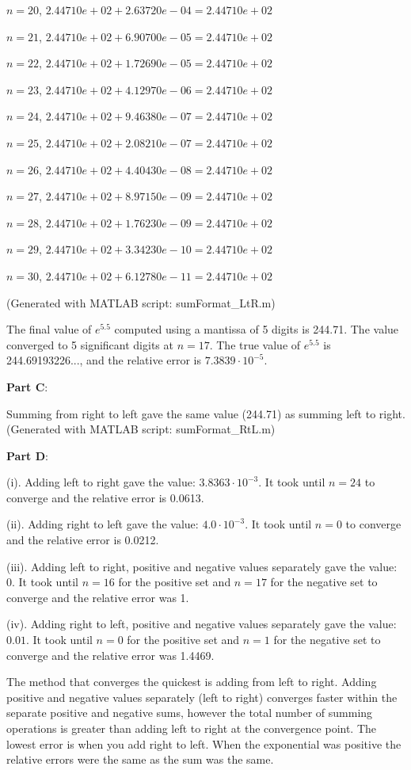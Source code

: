 \documentclass[12pt]{article}
\begin{document}
$n = 20$, $2.44710e+02 + 2.63720e-04 = 2.44710e+02$

$n = 21$, $2.44710e+02 + 6.90700e-05 = 2.44710e+02$

$n = 22$, $2.44710e+02 + 1.72690e-05 = 2.44710e+02$

$n = 23$, $2.44710e+02 + 4.12970e-06 = 2.44710e+02$

$n = 24$, $2.44710e+02 + 9.46380e-07 = 2.44710e+02$

$n = 25$, $2.44710e+02 + 2.08210e-07 = 2.44710e+02$

$n = 26$, $2.44710e+02 + 4.40430e-08 = 2.44710e+02$

$n = 27$, $2.44710e+02 + 8.97150e-09 = 2.44710e+02$

$n = 28$, $2.44710e+02 + 1.76230e-09 = 2.44710e+02$

$n = 29$, $2.44710e+02 + 3.34230e-10 = 2.44710e+02$

$n = 30$, $2.44710e+02 + 6.12780e-11 = 2.44710e+02$

(Generated with MATLAB script: sumFormat\_LtR.m)

The final value of $e^{5.5}$ computed using a mantissa of 5 digits is 244.71. The value converged to 5 significant digits at $n = 17$. The true value of $e^{5.5}$ is 244.69193226..., and the relative error is $7.3839 \cdot 10^{-5}$.

\noindent
\textbf{Part C}:

Summing from right to left gave the same value (244.71) as summing left to right. (Generated with MATLAB script: sumFormat\_RtL.m)

\noindent
\textbf{Part D}:

(i). Adding left to right gave the value: $3.8363 \cdot 10^{-3}$. It took until $n = 24$ to converge and the relative error is 0.0613.

(ii). Adding right to left gave the value: $4.0 \cdot 10^{-3}$. It took until $n = 0$ to converge and the relative error is 0.0212.

(iii). Adding left to right, positive and negative values separately gave the value: $0$. It took until $n = 16$ for the positive set and $n = 17$ for the negative set to converge and the relative error was 1.

(iv). Adding right to left, positive and negative values separately gave the value: $0.01$. It took until $n = 0$ for the positive set and $n = 1$ for the negative set to converge and the relative error was 1.4469.

The method that converges the quickest is adding from left to right. Adding positive and negative values separately (left to right) converges faster within the separate positive and negative sums, however the total number of summing operations is greater than adding left to right at the convergence point. The lowest error is when you add right to left. When the exponential was positive the relative errors were the same as the sum was the same.
\end{document}
